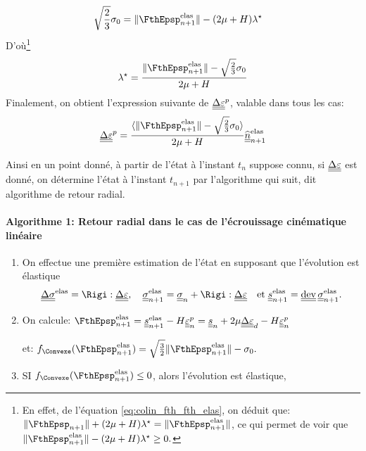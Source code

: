 \documentclass[10pt]{book}
\begin{document}
\begin{appendices}
\begin{Demo}
{$$\begin{aligned}
\sqrt{\frac{2}{3}}\sigma_{0}&=\Vert\FthEpsp_{n+1}^{\text{elas}}\Vert-(2\mu+H)\lambda^{\star}
\end{aligned}$$
D'où\footnote{ En effet, de l'équation \eqref{eq:colin_fth_fth_elas}, on déduit que: $\Vert \FthEpsp_{n+1}\Vert+(2\mu+H)\lambda^{\star}=\Vert\FthEpsp_{n+1}^{\text{elas}}\Vert$, ce qui permet de voir que $\Vert\FthEpsp_{n+1}^{\text{elas}}\Vert-(2\mu+H)\lambda^{\star}\geq 0.$}
$$ \lambda^{\star}=\frac{\Vert \FthEpsp_{n+1}^{\text{elas}}\Vert-\sqrt{\frac{2}{3}}\sigma_{0}}{2\mu+H}$$
Finalement, on obtient l'expression suivante de $\underline{\underline{\Delta}}\underline{\underline{\varepsilon}}^{p}$, valable dans tous les cas:
\begin{equation}
\DeltaEpsP=\frac{\langle\Vert\FthEpsp_{n+1}^{\text{elas}}\Vert-\sqrt{\frac{2}{3}}\sigma_{0}\rangle}{2\mu+H}\hat{\ten{n}}_{n+1}^{\text{elas}}
\label{eq:Correction_plastique_incre}
\end{equation}
}\end{Demo}
Ainsi en un point donné, à partir de l'état à l'instant $t_{n}$ suppose connu, si $\underline{\underline{\Delta}}\underline{\underline{\varepsilon}}$ est donné, on détermine l'état à l'instant $t_{n+1}$ par l'algorithme qui suit, dit algorithme de retour radial.
\paragraph{Algorithme 1: Retour radial dans le cas de l'écrouissage cinématique linéaire\\}
\begin{enumerate}
\item On effectue une première estimation de l'état en supposant que l'évolution est élastique
$$\DeltaSC^{\text{elas}}=\Rigi:\DeltaDefoHPP, \quad \SC_{n+1}^{\text{elas}}=\SC_{n}+\Rigi:\DeltaDefoHPP \quad \text{et} \; \devia^{\text{elas}}_{n+1}=\dev\SC^{\text{elas}}_{n+1}.$$
\item On calcule: $\FthEpsp_{n+1}^{\text{elas}}=\devia_{n+1}^{\text{elas}}-H\DefoHPP_{n}^{p}=\devia_{n}+2\mu\DeltaDefoHPP_{d}-H\DefoHPP^{p}_{n}$
\begin{center}
et: $\FChargeConvexe(\FthEpsp_{n+1}^{\text{elas}})=\sqrt{\frac{3}{2}}\Vert\FthEpsp_{n+1}^{\text{elas}}\Vert-\sigma_{0}.$
\end{center}
\item SI $\FChargeConvexe(\FthEpsp_{n+1}^{\text{elas}})\leq 0$, alors l'évolution est élastique,\\


\end{enumerate}
\end{appendices}
\end{document}

